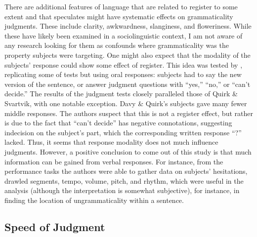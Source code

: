 There are additional features of language that are related to register to some extent and that \citet{Ross1979} speculates might have systematic effects on grammaticality judgments. These include clarity, awkwardness, slanginess, and floweriness. While these have likely been examined in a sociolinguistic context, I am not aware of any research looking for them as confounds where grammaticality was the property subjects were targeting. One might also expect that the modality of the subjects' response could show some effect of register. This idea was tested by \citet{DavyEtAl1969}, replicating some of  tests but using oral responses: subjects had to say the new version of the sentence, or answer judgment questions with ``yes,'' ``no,'' or ``can't decide.'' The results of the judgment tests closely paralleled those of Quirk \& Svartvik, with one notable exception. Davy \& Quirk's subjects gave many fewer middle responses. The authors suspect that this is not a register effect, but rather is due to the fact that ``can't decide'' has negative connotations, suggesting indecision on the subject's part, which the corresponding written response ``?'' lacked. Thus, it seems that response modality does not much influence judgments. However, a positive conclusion to come out of this study is that much information can be gained from verbal
responses. For instance, from the performance tasks the authors were able to gather data on subjects' hesitations, drawled segments, tempo, volume, pitch, and rhythm, which were useful in the analysis (although the interpretation is somewhat subjective), for instance, in finding the location of ungrammaticality within a sentence.
 
\subsection{Speed of Judgment} \label{sec:5.2.7} 

